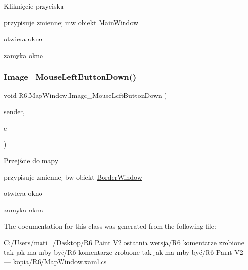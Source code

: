 Kliknięcie przycisku 

przypisuje zmiennej mw obiekt \mbox{\hyperlink{class_r6_1_1_main_window}{Main\+Window}} 

otwiera okno 

zamyka okno \mbox{\label{class_r6_1_1_map_window_a96a1b5a90b7741db29b019f02a1a0f59}} 
\subsubsection{\texorpdfstring{Image\_MouseLeftButtonDown()}{Image\_MouseLeftButtonDown()}}
{\footnotesize\ttfamily void R6.\+Map\+Window.\+Image\+\_\+\+Mouse\+Left\+Button\+Down (\begin{DoxyParamCaption}\item[{object}]{sender,  }\item[{Mouse\+Button\+Event\+Args}]{e }\end{DoxyParamCaption})\hspace{0.3cm}{\ttfamily [private]}}



Przejście do mapy 

przypisuje zmiennej bw obiekt \mbox{\hyperlink{class_r6_1_1_border_window}{Border\+Window}} 

otwiera okno 

zamyka okno 

The documentation for this class was generated from the following file\+:\begin{DoxyCompactItemize}
\item 
C\+:/\+Users/mati\+\_\+/\+Desktop/\+R6 Paint V2 ostatnia wersja/\+R6 komentarze zrobione tak jak ma niby być/\+R6 komentarze zrobione tak jak ma niby być/\+R6 Paint V2 — kopia/\+R6/Map\+Window.\+xaml.\+cs\end{DoxyCompactItemize}
